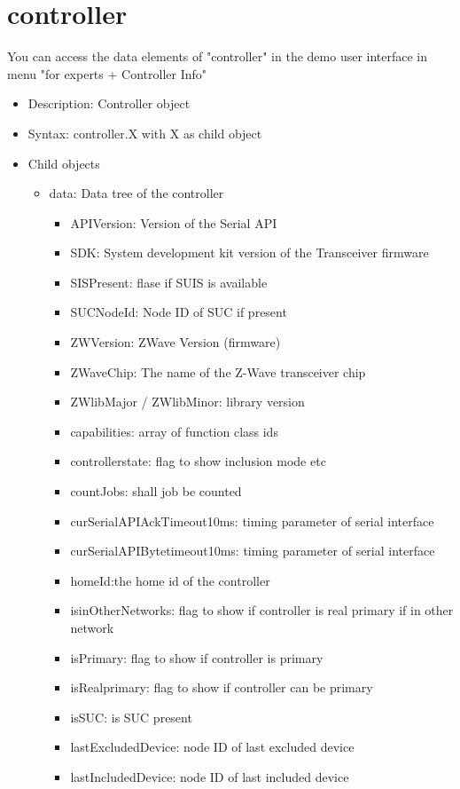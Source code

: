 \section{controller}

You can access the data elements of "controller" in the demo user interface in menu 
"for experts + Controller Info"

\begin {itemize}
\item Description: Controller object
\item Syntax: controller.X with  X as child object
\item Child objects
\begin {itemize}
\item data: Data tree of the controller
\begin {itemize}
\item  APIVersion: Version of the Serial API
\item  SDK: System development kit version of the Transceiver firmware
\item  SISPresent: flase if SUIS is available
\item  SUCNodeId: Node ID of SUC if present
\item  ZWVersion: ZWave Version (firmware)
\item  ZWaveChip: The name of the Z-Wave transceiver chip
\item  ZWlibMajor / ZWlibMinor: library version 
\item  capabilities: array of function class ids
\item  controllerstate: flag to show inclusion mode etc
\item  countJobs: shall job be counted
\item  curSerialAPIAckTimeout10ms: timing parameter of serial interface
\item  curSerialAPIBytetimeout10ms: timing parameter of serial interface
\item  homeId:the home id of the controller
\item  isinOtherNetworks: flag to show if controller is real primary if in other network
\item  isPrimary: flag to show if controller is primary
\item  isRealprimary: flag to show if controller can be  primary
\item  isSUC: is SUC present
\item  lastExcludedDevice: node ID of last excluded device
\item  lastIncludedDevice: node ID of last included device

\end{itemize}
\end{itemize}
\end{itemize}
